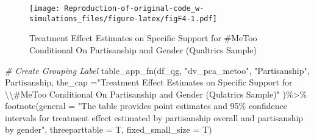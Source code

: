 \documentclass[
]{article}
\newenvironment{Shaded}{\begin{snugshade}}{\end{snugshade}}
\newcommand{\AttributeTok}[1]{\textcolor[rgb]{0.77,0.63,0.00}{#1}}
\newcommand{\CommentTok}[1]{\textcolor[rgb]{0.56,0.35,0.01}{\textit{#1}}}
\newcommand{\FunctionTok}[1]{\textcolor[rgb]{0.00,0.00,0.00}{#1}}
\newcommand{\NormalTok}[1]{#1}
\newcommand{\SpecialCharTok}[1]{\textcolor[rgb]{0.00,0.00,0.00}{#1}}
\newcommand{\StringTok}[1]{\textcolor[rgb]{0.31,0.60,0.02}{#1}}
\begin{document}
\begin{figure}
\centering
\texttt{[image: Reproduction-of-original-code\_w-simulations\_files/figure-latex/figF4-1.pdf]}
\caption{Treatment Effect Estimates on Specific Support for \#MeToo
Conditional On Partisanship and Gender (Qualtrics Sample)}
\end{figure}

\begin{Shaded}
\begin{Highlighting}[]
\CommentTok{\# Create Grouping Label }
\FunctionTok{table\_app\_fn}\NormalTok{(df\_qg, }\StringTok{"dv\_pca\_metoo"}\NormalTok{,}
         \StringTok{"Partisanship"}\NormalTok{,}
\NormalTok{         Partisanship,}
         \AttributeTok{the\_cap =}\StringTok{"Treatment Effect Estimates on Specific Support for }\SpecialCharTok{\textbackslash{}\textbackslash{}}\StringTok{\#MeToo Conditional On Partisanship and Gender (Qulatrics Sample)"}\NormalTok{ )}\SpecialCharTok{\%\textgreater{}\%}
  \FunctionTok{footnote}\NormalTok{(}\AttributeTok{general =} \StringTok{"The table provides point estimates and 95\% confidence intervals for treatment effect estimated by partisanship overall and partisanship by gender"}\NormalTok{,}
           \AttributeTok{threeparttable =}\NormalTok{ T,}
           \AttributeTok{fixed\_small\_size =}\NormalTok{ T)}
\end{Highlighting}
\end{Shaded}
\end{document}
